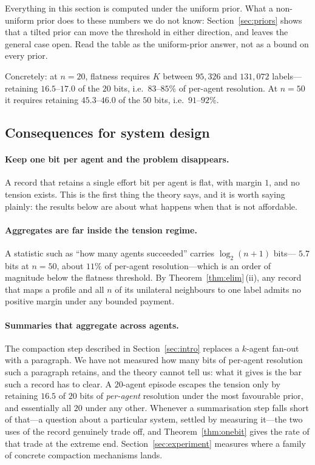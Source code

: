 Everything in this section is computed under the uniform prior. What a
non-uniform prior does to these numbers we do not know:
Section~\ref{sec:priors} shows that a tilted prior can move the threshold in
either direction, and leaves the general case open. Read the table as the
uniform-prior answer, not as a bound on every prior.

Concretely: at $n = 20$, flatness requires $K$ between $95{,}326$ and $131{,}072$
labels---retaining $16.5$--$17.0$ of the $20$ bits, i.e.\ $83$--$85\%$ of
per-agent resolution. At $n = 50$ it requires retaining $45.3$--$46.0$ of the
$50$ bits, i.e.\ $91$--$92\%$.

\subsection{Consequences for system design}

\paragraph{Keep one bit per agent and the problem disappears.}
A record that retains a single effort bit per agent is flat, with margin
$1$, and no tension exists. This is the first thing the theory says, and it is
worth saying plainly: the results below are about what happens when that is not
affordable.

\paragraph{Aggregates are far inside the tension regime.}
A statistic such as ``how many agents succeeded'' carries $\log_2(n+1)$ bits---
$5.7$ bits at $n = 50$, about $11\%$ of per-agent resolution---which is an order
of magnitude below the flatness threshold. By Theorem~\ref{thm:elim}\,(ii), any
record that maps a profile and all $n$ of its unilateral neighbours to one label
admits no positive margin under any bounded payment.

\paragraph{Summaries that aggregate across agents.}
The compaction step described in Section~\ref{sec:intro} replaces a $k$-agent
fan-out with a paragraph. We have not measured how many bits of per-agent
resolution such a paragraph retains, and the theory cannot tell us: what it gives
is the bar such a record has to clear. A $20$-agent episode escapes the tension
only by retaining $16.5$ of $20$ bits of \emph{per-agent} resolution under the
most favourable prior, and essentially all $20$ under any other. Whenever a
summarisation step falls short of that---a question about a particular system,
settled by measuring it---the two uses of the record genuinely trade off, and
Theorem~\ref{thm:onebit} gives the rate of that trade at the extreme end.
Section~\ref{sec:experiment} measures where a family of concrete compaction
mechanisms lands.

